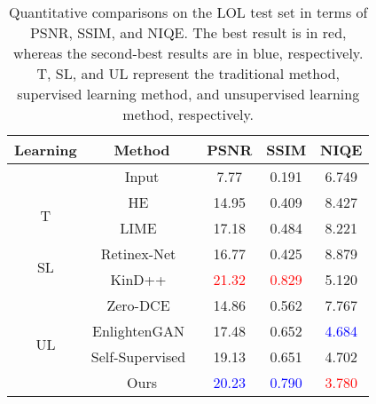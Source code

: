 \documentclass[journal]{IEEEtran}
\begin{document}
\begin{table}[t]
\centering
\caption{Quantitative comparisons on the LOL test set in terms of PSNR, SSIM, and NIQE. The best result is in red, whereas the second-best results are in blue, respectively. T, SL, and UL represent the traditional method, supervised learning method, and unsupervised learning method, respectively.}
\begin{tabular}{c|c|c|c|c}
\hline
\textbf{Learning} &\textbf{Method} &\textbf{PSNR} &\textbf{SSIM} &\textbf{NIQE}\\ \hline
 &Input &7.77 &0.191 &6.749\\ \hline
\multirow{2}{*}{T}
 &HE~\cite{pizer1990contrast} &14.95 &0.409 &8.427\\ 
 &LIME~\cite{guo2016lime} &17.18 &0.484 &8.221\\ \hline
\multirow{2}{*}{SL}
 &Retinex-Net~\cite{Chen2018Retinex} &16.77 &0.425 &8.879\\ 
 &KinD++~\cite{zhang2021beyond} &{\textcolor{red}{21.32}} &{\textcolor{red}{0.829}} &5.120\\ \hline
\multirow{4}{*}{UL}
 &Zero-DCE~\cite{guo2020zero} &14.86 &0.562 &7.767\\ 
 &EnlightenGAN~\cite{jiang2021enlightengan} &17.48 &0.652 &{\textcolor{blue}{4.684}}\\ 
 &Self-Supervised~\cite{zhang2020self} &19.13 &0.651 &4.702\\ 
 &Ours &{\textcolor{blue}{20.23}} &{\textcolor{blue}{0.790}} &{\textcolor{red}{3.780}}\\ \hline
\end{tabular}
\label{table:LOL}
\end{table}
\end{document}
